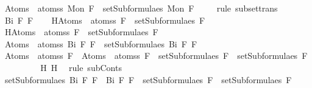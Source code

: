 \begin{isabellebody}
\ {\isachardoublequoteopen}Atom{\isacharunderscore}s\ {\isacharbackquote}\ atoms{\isacharunderscore}s\ {\isacharparenleft}Mon\ F{\isacharparenright}\ {\isasymsubseteq}\ setSubformulae{\isacharunderscore}s\ {\isacharparenleft}Mon\ F{\isacharparenright}{\isachardoublequoteclose}\ \isamarkupfalse%
\ {}\ \isamarkupfalse%
\ {\isacharparenleft}rule\ subset{\isacharunderscore}trans{\isacharparenright}\isanewline
\ \ \isamarkupfalse%
\isanewline
{}\isamarkupfalse%
\isanewline
\ \ \isamarkupfalse%
\ {\isacharparenleft}Bi\ F{}\ F{}{\isacharparenright}\isanewline
\ \ \isamarkupfalse%
\ H{}{\isacharcolon}{\isachardoublequoteopen}Atom{\isacharunderscore}s\ {\isacharbackquote}\ atoms{\isacharunderscore}s\ F{}\ {\isasymsubseteq}\ setSubformulae{\isacharunderscore}s\ F{}{\isachardoublequoteclose}\isanewline
\ \ \isamarkupfalse%
\ H{}{\isacharcolon}{\isachardoublequoteopen}Atom{\isacharunderscore}s\ {\isacharbackquote}\ atoms{\isacharunderscore}s\ F{}\ {\isasymsubseteq}\ setSubformulae{\isacharunderscore}s\ F{}{\isachardoublequoteclose}\isanewline
\ \ \isamarkupfalse%
\ {\isachardoublequoteopen}Atom{\isacharunderscore}s\ {\isacharbackquote}\ atoms{\isacharunderscore}s\ {\isacharparenleft}Bi\ F{}\ F{}{\isacharparenright}\ {\isasymsubseteq}\ setSubformulae{\isacharunderscore}s\ {\isacharparenleft}Bi\ F{}\ F{}{\isacharparenright}{\isachardoublequoteclose}\isanewline
\ \ \isamarkupfalse%
\ {\isacharminus}\isanewline
\ \ \ \ \isamarkupfalse%
\ {}{\isacharcolon}{\isachardoublequoteopen}{\isacharparenleft}Atom{\isacharunderscore}s\ {\isacharbackquote}\ atoms{\isacharunderscore}s\ F{}{\isacharparenright}\ {\isasymunion}\ {\isacharparenleft}Atom{\isacharunderscore}s\ {\isacharbackquote}\ atoms{\isacharunderscore}s\ F{}{\isacharparenright}\ {\isasymsubseteq}\ setSubformulae{\isacharunderscore}s\ F{}\ {\isasymunion}\ setSubformulae{\isacharunderscore}s\ F{}{\isachardoublequoteclose}\ \isanewline
\ \ \ \ \ \ \isamarkupfalse%
\ H{}\ H{}\ \isamarkupfalse%
\ {\isacharparenleft}rule\ subConts{\isacharparenright}\isanewline
\ \ \ \ \isamarkupfalse%
\ {\isachardoublequoteopen}setSubformulae{\isacharunderscore}s\ {\isacharparenleft}Bi\ F{}\ F{}{\isacharparenright}\ {\isacharequal}\ {\isacharbraceleft}Bi\ F{}\ F{}{\isacharbraceright}\ {\isasymunion}\ {\isacharparenleft}setSubformulae{\isacharunderscore}s\ F{}\ {\isasymunion}\ setSubformulae{\isacharunderscore}s\ F{}{\isacharparenright}{\isachardoublequoteclose}\ \isamarkupfalse%

\end{isabellebody}
